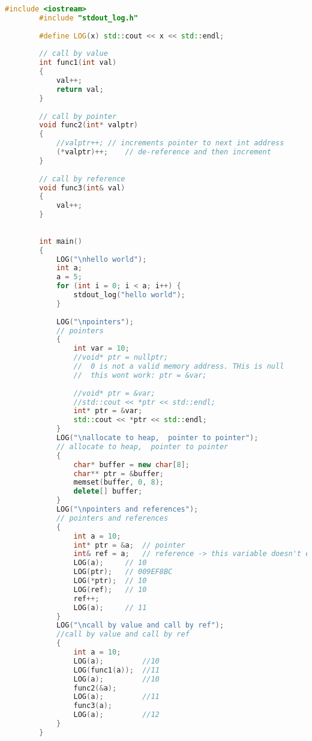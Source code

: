 \documentclass{article}
\begin{document}
    \begin{lstlisting}[language=C++, caption=Pointers example]
        #include <iostream>
        #include "stdout_log.h"
        
        #define LOG(x) std::cout << x << std::endl;
        
        // call by value
        int func1(int val) 
        {
        	val++;
        	return val;
        }
        
        // call by pointer
        void func2(int* valptr) 
        {
        	//valptr++; // increments pointer to next int address
        	(*valptr)++;	// de-reference and then increment
        }
        
        // call by reference
        void func3(int& val)
        {
        	val++;
        }
        
        
        int main()
        {
        	LOG("\nhello world");
            int a;
        	a = 5;
        	for (int i = 0; i < a; i++) {
        		stdout_log("hello world");
        	}
        
        	LOG("\npointers");
        	// pointers
        	{
        		int var = 10;
        		//void* ptr = nullptr; 
        		//  0 is not a valid memory address. THis is null
        		//  this wont work: ptr = &var;
        		
        		//void* ptr = &var;
        		//std::cout << *ptr << std::endl;
        		int* ptr = &var;
        		std::cout << *ptr << std::endl;
        	}
        	LOG("\nallocate to heap,  pointer to pointer");
        	// allocate to heap,  pointer to pointer
        	{
        		char* buffer = new char[8];
        		char** ptr = &buffer;
        		memset(buffer, 0, 8);
        		delete[] buffer;
        	}
        	LOG("\npointers and references");
        	// pointers and references
        	{
        		int a = 10;
        		int* ptr = &a;	// pointer
        		int& ref = a;	// reference -> this variable doesn't exist
        		LOG(a);		// 10
        		LOG(ptr);	// 009EF8BC
        		LOG(*ptr);	// 10
        		LOG(ref);	// 10
        		ref++;
        		LOG(a);		// 11
        	}
        	LOG("\ncall by value and call by ref");
        	//call by value and call by ref
        	{
        		int a = 10;
        		LOG(a);	        //10
        		LOG(func1(a));	//11
        		LOG(a);	        //10
        		func2(&a);
        		LOG(a);	        //11
        		func3(a);
        		LOG(a);	        //12
        	}
        }
        \end{lstlisting}
        
\end{document}
